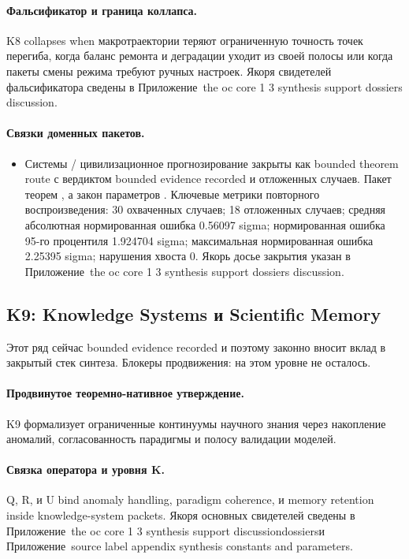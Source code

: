 \paragraph{Фальсификатор и граница коллапса.}
K8 collapses when макротраектории теряют ограниченную точность точек перегиба, когда баланс ремонта и деградации уходит из своей полосы или когда пакеты смены режима требуют ручных настроек.
Якоря свидетелей фальсификатора сведены в Приложение~the oc core 1 3 synthesis support dossiers discussion.

\paragraph{Связки доменных пакетов.}
\begin{itemize}[leftmargin=1.6em,nosep]
\item Системы / цивилизационное прогнозирование закрыты как bounded theorem route с вердиктом bounded evidence recorded и  отложенных случаев. Пакет теорем , а закон параметров . Ключевые метрики повторного воспроизведения: 30 охваченных случаев; 18 отложенных случаев; средняя абсолютная нормированная ошибка 0.56097 sigma; нормированная ошибка 95-го процентиля 1.924704 sigma; максимальная нормированная ошибка 2.25395 sigma; нарушения хвоста 0. Якорь досье закрытия указан в Приложение~the oc core 1 3 synthesis support dossiers discussion.
\end{itemize}

\subsection{K9: Knowledge Systems и Scientific Memory}
\label{sec:oc-core-1-3-synthesis-k9}
Этот ряд сейчас bounded evidence recorded и поэтому законно вносит вклад в закрытый стек синтеза.
Блокеры продвижения: на этом уровне не осталось.

\paragraph{Продвинутое теоремно-нативное утверждение.}
K9 формализует ограниченные континуумы научного знания через накопление аномалий, согласованность парадигмы и полосу валидации моделей.

\paragraph{Связка оператора и уровня K.}
Q, R, и U bind anomaly handling, paradigm coherence, и memory retention inside knowledge-system packets.
Якоря основных свидетелей сведены в Приложение~the oc core 1 3 synthesis support discussiondossiersи Приложение~source label appendix synthesis constants and parameters.

